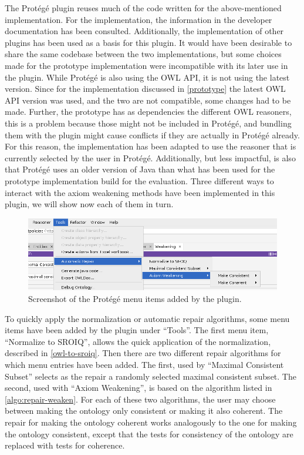 
The Protégé plugin reuses much of the code written for the above-mentioned implementation. For the implementation, the information in the developer documentation \cite{protege5devdocs} has been consulted. Additionally, the implementation of other plugins \cite{ontodebug,protegepluginexamples} has been used as a basis for this plugin. It would have been desirable to share the same codebase between the two implementations, but some choices made for the prototype implementation were incompatible with its later use in the plugin. While Protégé is also using the OWL API, it is not using the latest version. Since for the implementation discussed in \cref{prototype} the latest OWL API version was used, and the two are not compatible, some changes had to be made. Further, the prototype has as dependencies the different OWL reasoners, this is a problem because those might not be included in Protégé, and bundling them with the plugin might cause conflicts if they are actually in Protégé already. For this reason, the implementation has been adapted to use the reasoner that is currently selected by the user in Protégé. Additionally, but less impactful, is also that Protégé uses an older version of Java than what has been used for the prototype implementation build for the evaluation. Three different ways to interact with the axiom weakening methods have been implemented in this plugin, we will show now each of them in turn.

\begin{figure}[ht]
  \centering
  \includegraphics[width=\textwidth]{resources/protege-menu.png}
  \caption{Screenshot of the Protégé menu items added by the plugin.}
  \label{fig:protege-menu}
\end{figure}

To quickly apply the normalization or automatic repair algorithms, some menu items have been added by the plugin under ``Tools''. The first menu item, ``Normalize to SROIQ'', allows the quick application of the normalization, described in \cref{owl-to-sroiq}. Then there are two different repair algorithms for which menu entries have been added. The first, used by ``Maximal Consistent Subset'' selects as the repair a randomly selected maximal consistent subset. The second, used with ``Axiom Weakening'', is based on the algorithm listed in \cref{algo:repair-weaken}. For each of these two algorithms, the user may choose between making the ontology only consistent or making it also coherent. The repair for making the ontology coherent works analogously to the one for making the ontology consistent, except that the tests for consistency of the ontology are replaced with tests for coherence.

